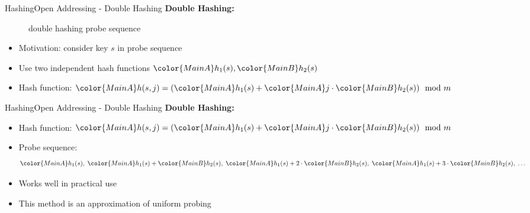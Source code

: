 
\begin{frame}{Hashing}{Open Addressing - Double Hashing}
  \textbf{Double Hashing:}
  \vspace{-1.0em}
  \begin{figure}[!h]
    \begin{adjustbox}{width=0.9\linewidth}%
    \end{adjustbox}
    \caption{double hashing probe sequence}%
    \label{fig:hashing:open_addressing:double_hashing}%
  \end{figure}
  \vspace{-1.0em}
  \begin{itemize}
    \item<2->
      Motivation: consider key {\color{MainA}$s$} in probe sequence
    \item<3->
      Use two independent hash functions
      \begin{math}
        {\color{MainA}h_1(s)},
        {\color{MainB}h_2(s)}
      \end{math}
    \item<4->
      Hash function:
      \begin{math}
        {\color{MainA}h(s,j)
        = ({\color{MainA}h_1(s)}
        + {\color{MainA}j} \cdot {\color{MainB}h_2(s)})}
        \mod m
      \end{math}
  \end{itemize}

\end{frame}


\begin{frame}{Hashing}{Open Addressing - Double Hashing}
  \textbf{Double Hashing:}
  \begin{itemize}
    \item
      Hash function:
      \begin{math}
        {\color{MainA}h(s,j)
        = ({\color{MainA}h_1(s)}
        + {\color{MainA}j} \cdot {\color{MainB}h_2(s)})}
        \mod m
      \end{math}
    \item<2->
      Probe sequence:
      \begin{displaymath}
        {\color{MainA}h_1(s)} ,\;
        {\color{MainA}h_1(s)} + {\color{MainB}h_2(s)} ,\;
        {\color{MainA}h_1(s)} + 2 \cdot {\color{MainB}h_2(s)} ,\;
        {\color{MainA}h_1(s)} + 3 \cdot {\color{MainB}h_2(s)} ,\;
        \dotsc
      \end{displaymath}
    \item<3->
      Works well in practical use
    \item<4->
      This method is an approximation of uniform probing
  \end{itemize}
\end{frame}

